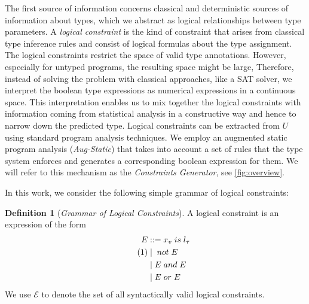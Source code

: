 \documentclass[sigplan,10pt,review,anonymous]{acmart}
\newcommand\numberthis{\addtocounter{equation}{1}\tag{\theequation}}
\theoremstyle{plain}
\theoremstyle{remark}
\theoremstyle{definition}
\newtheorem{defn}{Definition}[section]
\begin{document}
The first source of information concerns classical and deterministic sources of
information about types, which we abstract as logical relationships between type
parameters. 
 A \emph{logical constraint} is the kind of  
  constraint that arises from classical 
  type inference rules and consist of logical formulas about
  the type assignment. 
%
The logical constraints
restrict the space 
of valid type annotations. However, especially for untyped programs, the resulting space might be large,
Therefore, instead of solving the problem
with classical approaches, like a SAT solver, we interpret the boolean 
type expressions as numerical expressions in a continuous space. This
interpretation enables us to mix together the logical constraints with
information coming from statistical analysis in a constructive way and hence to
narrow down the predicted type. 
Logical constraints can be extracted from $U$ using
standard program analysis techniques.
We employ an augmented static program analysis (\textit{Aug-Static}) that 
takes into account a set of rules that the type system enforces and 
generates a corresponding boolean expression for them.
We will refer to this mechanism as the \emph{Constraints Generator}, see \cref{fig:overview}.

In this work, we consider the following simple grammar of logical constraints:
\begin{defn}[\emph{Grammar of Logical Constraints}]\label{def:log-gram}
A logical constraint is an expression of the form
  \begin{align*}
    E & ::= x_v \mathrel{is} l_\tau  \\ \numberthis\label{eq:gram}
    & \mid{} \mathrel{not} E\\
    & \mid E \mathrel{and} E   \\
    & \mid E \mathrel{or} E    
  \end{align*}
We use $\mathcal{E}$ to denote the set of all syntactically valid
logical constraints.
\end{defn}
\end{document}
